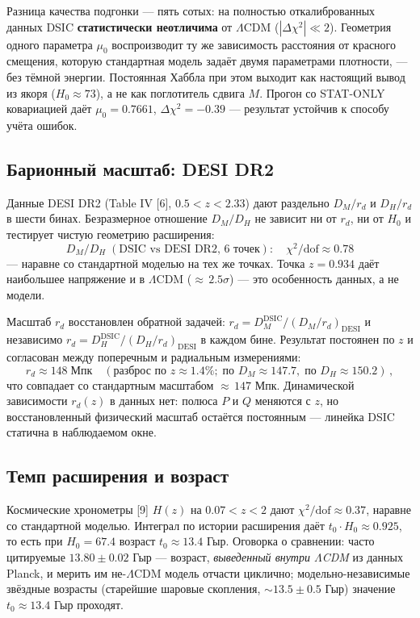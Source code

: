 \documentclass{article}
\begin{document}
Разница качества подгонки --- пять сотых: на полностью откалиброванных данных DSIC \textbf{статистически неотличима} от $\Lambda$CDM ($|\Delta\chi^2| \ll 2$). Геометрия одного параметра $\mu_0$ воспроизводит ту же зависимость расстояния от красного смещения, которую стандартная модель задаёт двумя параметрами плотности, --- без тёмной энергии. Постоянная Хаббла при этом выходит как настоящий вывод из якоря ($H_0 \approx 73$), а не как поглотитель сдвига $M$. Прогон со STAT-ONLY ковариацией даёт $\mu_0 = 0.7661$, $\Delta\chi^2 = -0.39$ --- результат устойчив к способу учёта ошибок.

\subsection{Барионный масштаб: DESI DR2}

Данные DESI DR2 (Table IV [6], $0.5 < z < 2.33$) дают раздельно $D_M/r_d$ и $D_H/r_d$ в шести бинах. Безразмерное отношение $D_M/D_H$ не зависит ни от $r_d$, ни от $H_0$ и тестирует чистую геометрию расширения:
\begin{equation*}
D_M/D_H \;(\text{DSIC vs DESI DR2, 6 точек}): \quad \chi^2/\text{dof} \approx 0.78
\end{equation*}
--- наравне со стандартной моделью на тех же точках. Точка $z = 0.934$ даёт наибольшее напряжение и в $\Lambda$CDM (${\approx}\,2.5\sigma$) --- это особенность данных, а не модели.

Масштаб $r_d$ восстановлен обратной задачей: $r_d = D_M^{\text{DSIC}}/(D_M/r_d)_{\text{DESI}}$ и независимо $r_d = D_H^{\text{DSIC}}/(D_H/r_d)_{\text{DESI}}$ в каждом бине. Результат постоянен по $z$ и согласован между поперечным и радиальным измерениями:
\begin{equation*}
r_d \approx 148\;\text{Мпк} \quad (\text{разброс по } z \approx 1.4\%;\; \text{по } D_M \approx 147.7,\; \text{по } D_H \approx 150.2)\,,
\end{equation*}
что совпадает со стандартным масштабом ${\approx}\,147$ Мпк. Динамической зависимости $r_d(z)$ в данных нет: полюса $P$ и $Q$ меняются с $z$, но восстановленный физический масштаб остаётся постоянным --- линейка DSIC статична в наблюдаемом окне.

\subsection{Темп расширения и возраст}

Космические хронометры [9] $H(z)$ на $0.07 < z < 2$ дают $\chi^2/\text{dof} \approx 0.37$, наравне со стандартной моделью. Интеграл по истории расширения даёт $t_0\cdot H_0 \approx 0.925$, то есть при $H_0 = 67.4$ возраст $t_0 \approx 13.4$ Гыр. Оговорка о сравнении: часто цитируемые $13.80 \pm 0.02$ Гыр --- возраст, \textit{выведенный внутри $\Lambda$CDM} из данных Planck, и мерить им не-$\Lambda$CDM модель отчасти циклично; модельно-независимые звёздные возрасты (старейшие шаровые скопления, ${\sim}13.5 \pm 0.5$ Гыр) значение $t_0 \approx 13.4$ Гыр проходят.
\end{document}
